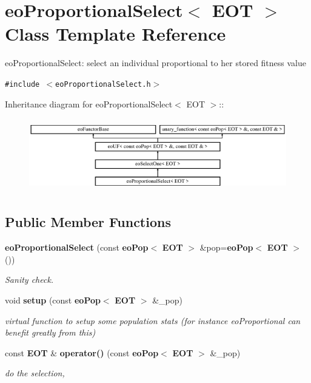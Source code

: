 \section{eo\-Proportional\-Select$<$ EOT $>$ Class Template Reference}
\label{classeo_proportional_select}
eo\-Proportional\-Select: select an individual proportional to her stored fitness value  


{\tt \#include $<$eo\-Proportional\-Select.h$>$}

Inheritance diagram for eo\-Proportional\-Select$<$ EOT $>$::\begin{figure}[H]
\begin{center}
\leavevmode
\includegraphics[height=3.23699cm]{classeo_proportional_select}
\end{center}
\end{figure}
\subsection*{Public Member Functions}
\begin{CompactItemize}
\item 
{\bf eo\-Proportional\-Select} (const {\bf eo\-Pop}$<$ {\bf EOT} $>$ \&pop={\bf eo\-Pop}$<$ {\bf EOT} $>$())\label{classeo_proportional_select_a0}

\begin{CompactList}\small\item\em Sanity check. \item\end{CompactList}\item 
void {\bf setup} (const {\bf eo\-Pop}$<$ {\bf EOT} $>$ \&\_\-pop)\label{classeo_proportional_select_a1}

\begin{CompactList}\small\item\em virtual function to setup some population stats (for instance eo\-Proportional can benefit greatly from this) \item\end{CompactList}\item 
const {\bf EOT} \& {\bf operator()} (const {\bf eo\-Pop}$<$ {\bf EOT} $>$ \&\_\-pop)\label{classeo_proportional_select_a2}

\begin{CompactList}\small\item\em do the selection, \item\end{CompactList}\end{CompactItemize}
